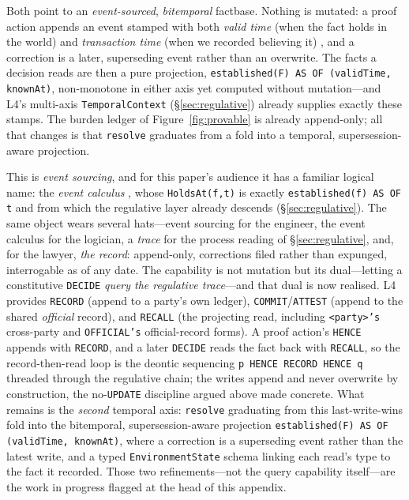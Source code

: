 \documentclass[sigconf,nonacm]{acmart}
\newcommand{\code}[1]{\texttt{\small #1}}
\begin{document}
Both point to an \emph{event-sourced}, \emph{bitemporal} factbase. Nothing is
mutated: a proof action appends an event stamped with both \emph{valid time}
(when the fact holds in the world) and \emph{transaction time} (when we recorded
believing it) \cite{snodgrass2000temporal}, and a correction is a later,
superseding event rather than an overwrite. The facts a decision reads are then a
pure projection, \code{established(F) AS OF (validTime, knownAt)}, non-monotone
in either axis yet computed without mutation---and L4's multi-axis
\code{TemporalContext} (\S\ref{sec:regulative}) already supplies exactly these
stamps. The burden ledger of Figure~\ref{fig:provable} is already append-only;
all that changes is that \code{resolve} graduates from a fold into a temporal,
supersession-aware projection.

This is \emph{event sourcing}, and for this paper's audience it has a familiar
logical name: the \emph{event calculus} \cite{kowalski1986events}, whose
\code{HoldsAt(f,t)} is exactly \code{established(f) AS OF t} and from which the
regulative layer already descends (\S\ref{sec:regulative}). The same object
wears several hats---event sourcing for the engineer, the event calculus for the
logician, a \emph{trace} for the process reading of \S\ref{sec:regulative}, and,
for the lawyer, \emph{the record}: append-only, corrections filed rather than
expunged, interrogable as of any date. The capability is not mutation but its
dual---letting a constitutive \code{DECIDE} \emph{query the regulative
trace}---and that dual is now realised. L4 provides \code{RECORD} (append to a
party's own ledger), \code{COMMIT}/\code{ATTEST} (append to the shared
\emph{official} record), and \code{RECALL} (the projecting read, including
\code{<party>'s} cross-party and \code{OFFICIAL's} official-record forms). A
proof action's \code{HENCE} appends with \code{RECORD}, and a later \code{DECIDE}
reads the fact back with \code{RECALL}, so the record-then-read loop is the
deontic sequencing \mbox{\code{p HENCE RECORD HENCE q}} threaded through the
regulative chain; the writes append and never overwrite by construction, the
no-\code{UPDATE} discipline argued above made concrete. What remains is the
\emph{second} temporal axis: \code{resolve} graduating from this last-write-wins
fold into the bitemporal, supersession-aware projection \code{established(F) AS OF
(validTime, knownAt)}, where a correction is a superseding event rather than the
latest write, and a typed \code{EnvironmentState} schema linking each read's type
to the fact it recorded. Those two refinements---not the query capability
itself---are the work in progress flagged at the head of this appendix.



\end{document}
